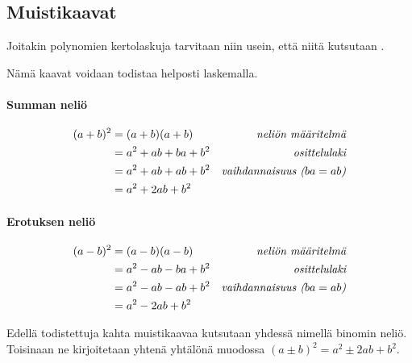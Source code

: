 \subsection*{Muistikaavat}


Joitakin polynomien kertolaskuja tarvitaan niin usein, että niitä kutsutaan .


Nämä kaavat voidaan todistaa helposti laskemalla.

\paragraph*{Summan neliö}

\begin{align*}
(a+b)^2 &= (a+b)(a+b) &\emph{neliön määritelmä} \\
&= a^2+ab+ba+b^2 &\emph{osittelulaki} \\
&= a^2+ab+ab+b^2 &\emph{vaihdannaisuus ($ba=ab$)} \\
&= a^2+2ab+b^2
\end{align*}

\paragraph*{Erotuksen neliö}

\begin{align*}
(a-b)^2 &= (a-b)(a-b) &\emph{neliön määritelmä} \\
&= a^2-ab-ba+b^2 &\emph{osittelulaki} \\
&= a^2-ab-ab+b^2 &\emph{vaihdannaisuus ($ba=ab$)} \\
&= a^2-2ab+b^2
\end{align*}

Edellä todistettuja kahta muistikaavaa kutsutaan yhdessä nimellä binomin neliö. Toisinaan ne kirjoitetaan yhtenä yhtälönä muodossa $(a \pm b)^2=a^2 \pm 2ab+b^2$. %

